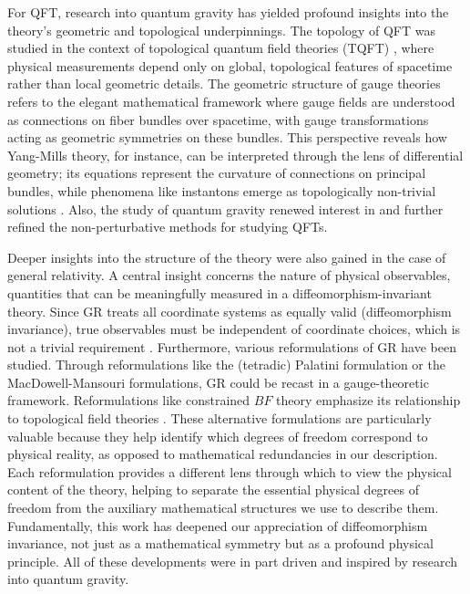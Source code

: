 For QFT, research into quantum gravity has yielded profound insights into the
theory's geometric and topological underpinnings. The topology of QFT was
studied in the context of topological quantum field theories (TQFT) \cite{atiyahTopologicalQuantumField1989}, where
physical measurements depend only on global, topological features of spacetime
rather than local geometric details. The geometric structure of gauge theories
refers to the elegant mathematical framework where gauge fields are understood
as connections on fiber bundles over spacetime, with gauge transformations
acting as geometric symmetries on these bundles. This perspective reveals how
Yang-Mills theory, for instance, can be interpreted through the lens of
differential geometry; its equations represent the curvature of connections on
principal bundles, while phenomena like instantons emerge as topologically
non-trivial solutions
\cite{ocampoGeometricTopologicalMethods2010,labastidaTopologicalQuantumField2005,nakaharaGeometryTopologyPhysics2018,naberTopologyGeometryGauge2011,hamiltonMathematicalGaugeTheory2017}.
Also, the study of quantum gravity renewed interest in and further refined the
non-perturbative methods for studying QFTs. 

Deeper insights into the structure of the theory were also gained in the case
of general relativity. A central insight concerns the nature of physical
observables, quantities that can be meaningfully measured in a
diffeomorphism-invariant theory. Since GR treats all coordinate systems as
equally valid (diffeomorphism invariance), true observables must be independent
of coordinate choices, which is not a trivial requirement
\cite{bergmannObservablesGeneralRelativity1961,perezObservablesQuantumGravity2010}.
Furthermore, various reformulations of GR have been studied. Through
reformulations like the (tetradic) Palatini formulation or the
MacDowell-Mansouri formulations, GR could be recast in a gauge-theoretic
framework. Reformulations like constrained $BF$ theory emphasize its relationship
to topological field theories
\cite{krasnovFormulationsGeneralRelativity2020}.
These alternative formulations are particularly valuable because they help
identify which degrees of freedom correspond to physical reality, as opposed to
mathematical redundancies in our description. Each reformulation provides a
different lens through which to view the physical content of the theory,
helping to separate the essential physical degrees of freedom from the
auxiliary mathematical structures we use to describe them. Fundamentally, this
work has deepened our appreciation of diffeomorphism invariance, not just as a
mathematical symmetry but as a profound physical principle. All of these
developments were in part driven and inspired by research into quantum gravity.

